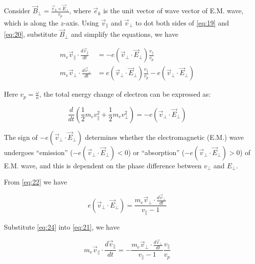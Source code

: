 \documentclass{cpbtex}
\begin{document}
\begin{CJK*}{GBK}{song}
Consider $\vec{B}_\perp = \frac{\vec{e}_k \times \vec{E}_\perp}{v_p}$, where $\vec{e}_k$ is the unit vector of wave vector of E.M. wave, which is along the $z$-axis. Using $\vec{v}_\parallel$ and $\vec{v}_\perp$ to dot both sides of \eqref{eq:19} and \eqref{eq:20}, substitute $\vec{B}_\perp$ and simplify the equations, we have

\begin{align}
m_e \vec{v}_\parallel \cdot \frac{d\vec{v}_\parallel}{dt} &= -e(\vec{v}_\perp \cdot \vec{E}_\perp) \frac{v_\parallel}{v_p} \label{eq:21} \\
m_e \vec{v}_\perp \cdot \frac{d\vec{v}_\perp}{dt} &= e(\vec{v}_\perp \cdot \vec{E}_\perp) \frac{v_\parallel}{v_p} - e(\vec{v}_\perp \cdot \vec{E}_\perp) \label{eq:22}
\end{align}

Here $v_p = \frac{\omega}{\kappa}$, the total energy change of electron can be expressed as:

\begin{equation}
\frac{d}{dt} \left( \frac{1}{2} m_e v_\parallel^2 + \frac{1}{2} m_e v_\perp^2 \right) = -e(\vec{v}_\perp \cdot \vec{E}_\perp) \label{eq:23}
\end{equation}

The sign of $-e(\vec{v}_\perp \cdot \vec{E}_\perp)$ determines whether the electromagnetic (E.M.) wave undergoes ``emission'' ($-e(\vec{v}_\perp \cdot \vec{E}_\perp) < 0$) or ``absorption'' ($-e(\vec{v}_\perp \cdot \vec{E}_\perp) > 0$) of E.M. wave, and this is dependent on the phase difference between $v_\perp$ and $E_\perp$.

From \eqref{eq:22} we have

\begin{equation}
e(\vec{v}_\perp \cdot \vec{E}_\perp) = \frac{m_e \vec{v}_\perp \cdot \frac{d\vec{v}_\perp}{dt}}{v_\parallel - 1} \label{eq:24}
\end{equation}

Substitute \eqref{eq:24} into \eqref{eq:21}, we have

\begin{equation}
m_e \vec{v}_\parallel \cdot \frac{d\vec{v}_\parallel}{dt} = -\frac{m_e \vec{v}_\perp \cdot \frac{d\vec{v}_\perp}{dt}}{v_\parallel - 1} \frac{v_\parallel}{v_p} \label{eq:25}
\end{equation}


\end{CJK*}
\end{document}
